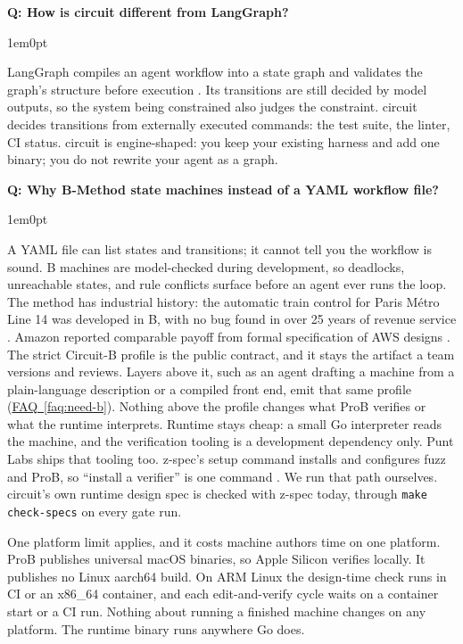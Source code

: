 \documentclass[11pt,letterpaper]{article}
\newcounter{faqnum}
\newenvironment{faqpair}[1]{%
  \needspace{4\baselineskip}%
  \vspace{0.5em}%
  \refstepcounter{faqnum}%
  \noindent\textbf{\color{SectionBlue}Q\thefaqnum: #1}\par\nopagebreak[4]%
  \vspace{0.2em}%
  \begin{adjustwidth}{1em}{0pt}%
  \setlength{\parindent}{0pt}%
}{%
  \end{adjustwidth}%
  \vspace{0.5em}%
}
\newcommand{\faqref}[1]{\hyperref[#1]{FAQ~\ref*{#1}}}
\begin{document}
\begin{faqpair}{How is circuit different from LangGraph?}
\label{faq:vs-langgraph}
  LangGraph compiles an agent workflow into a state graph and validates the graph's structure before execution \cite{langgraph2026docs}. Its transitions are still decided by model outputs, so the system being constrained also judges the constraint. circuit decides transitions from externally executed commands: the test suite, the linter, CI status. circuit is engine-shaped: you keep your existing harness and add one binary; you do not rewrite your agent as a graph.
\end{faqpair}

\begin{faqpair}{Why B-Method state machines instead of a YAML workflow file?}
\label{faq:why-b-method}
  A YAML file can list states and transitions; it cannot tell you the workflow is sound. B machines are model-checked during development, so deadlocks, unreachable states, and rule conflicts surface before an agent ever runs the loop. The method has industrial history: the automatic train control for Paris M\'etro Line 14 was developed in B, with no bug found in over 25 years of revenue service \cite{clearsy2024meteor}. Amazon reported comparable payoff from formal specification of AWS designs \cite{newcombe2015awsformalmethods}. The strict Circuit-B profile is the public contract, and it stays the artifact a team versions and reviews. Layers above it, such as an agent drafting a machine from a plain-language description or a compiled front end, emit that same profile (\faqref{faq:need-b}). Nothing above the profile changes what ProB verifies or what the runtime interprets. Runtime stays cheap: a small Go interpreter reads the machine, and the verification tooling is a development dependency only. Punt Labs ships that tooling too. z-spec's setup command installs and configures fuzz and ProB, so ``install a verifier'' is one command \cite{zspec2026}. We run that path ourselves. circuit's own runtime design spec is checked with z-spec today, through \mbox{\texttt{make check-specs}} on every gate run.

  One platform limit applies, and it costs machine authors time on one platform. ProB publishes universal macOS binaries, so Apple Silicon verifies locally. It publishes no Linux aarch64 build. On ARM Linux the design-time check runs in CI or an x86\_64 container, and each edit-and-verify cycle waits on a container start or a CI run. Nothing about running a finished machine changes on any platform. The runtime binary runs anywhere Go does.
\end{faqpair}
\end{document}
